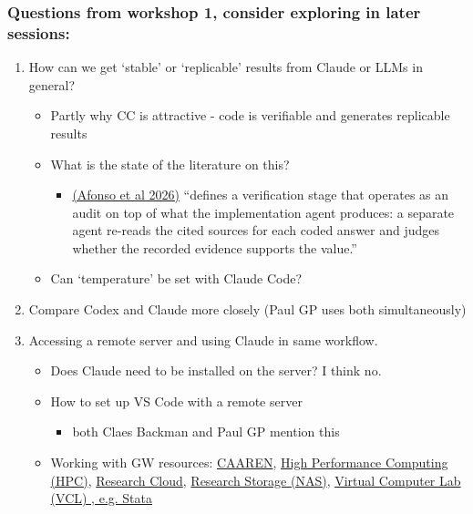 \documentclass[aspectratio=169, 12pt]{beamer}
\begin{document}
\begin{frame}

\frametitle{Questions from workshop 1, consider exploring in later sessions:}
\begin{enumerate}
    \item How can we get `stable' or `replicable' results from Claude or LLMs in general? 
    \begin{itemize}
        \item Partly why CC is attractive - code is verifiable and generates replicable results
        \item What is the state of the literature on this? 
        \begin{itemize}
            \item {\tiny \href{https://www.nber.org/papers/w35188}{(Afonso et al 2026)} ``defines a verification stage that operates as an audit on top of what the implementation agent produces: a separate agent re-reads the cited sources for each coded answer and judges whether the recorded evidence supports the value.'' }
        \end{itemize}
        
        \item Can `temperature' be set with Claude Code?
    \end{itemize}
    \item Compare Codex and Claude more closely (Paul GP uses both simultaneously)
    \item Accessing a remote server and using Claude in same workflow.     
    \begin{itemize}
        \item Does Claude need to be installed on the server? I think no. 
        \item How to set up VS Code with a remote server
        \begin{itemize}
            \item both Claes Backman and Paul GP mention this
        \end{itemize}
        \item Working with GW resources: \href{https://it.gwu.edu/caaren}{CAAREN}, \href{https://it.gwu.edu/hpc}{High Performance Computing (HPC)}, \href{https://it.gwu.edu/research-cloud}{Research Cloud}, \href{https://it.gwu.edu/research-storage-nas}{Research Storage (NAS)}, \href{https://library.gwu.edu/VCL}{Virtual Computer Lab (VCL)
, e.g. Stata}
    \end{itemize}
\end{enumerate}

\end{frame}
\end{document}
